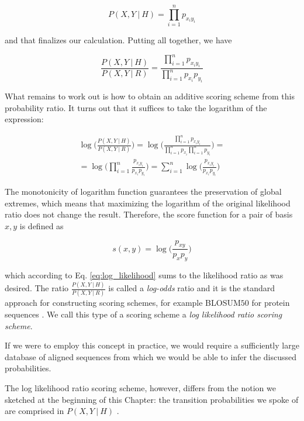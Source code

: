 \begin{equation}
P(X, Y ~|~ H) = \prod_{i=1}^n p_{x_i y_i}
\end{equation}

and that finalizes our calculation. Putting all together, we have

\begin{equation}
    \frac{P(X, Y ~|~ H)}{P(X, Y ~|~ R)} = \frac{\prod_{i=1}^n p_{x_i y_i}}{\prod_{i=1}^n p_{x_i}p_{y_{i}}}
\end{equation}

What remains to work out is how to obtain an additive scoring scheme from this probability ratio. It turns out that it suffices to take the logarithm of the expression:

\begin{multline}
\log\Bigg( \frac{P(X, Y ~|~ H)}{P(X, Y ~|~ R)} \Bigg) =
\log \Bigg( \frac{
\prod_{i=1}^n p_{x_i y_i} }
{\prod_{i=1}^n p_{x_i} \prod_{i=1}^n p_{y_i}} \Bigg) =\\
= \log \Bigg(\prod_{i=1}^n \frac{p_{x_i y_i}}{p_{x_i}p_{y_i}} \Bigg) =
\sum_{i=1}^n \log \Bigg( \frac{p_{x_i y_i}}{p_{x_i}p_{y_i}} \Bigg)
\label{eq:log_likelihood}
\end{multline}

The monotonicity of logarithm function guarantees the preservation of global extremes, which means that maximizing the logarithm of the original likelihood ratio does not change the result. Therefore, the score function for a pair of basis $x,y$ is defined as

\begin{equation}
s(x, y) = \log \Bigg( \frac{p_{x y}}{p_{x}p_{y}} \Bigg)
\end{equation}

which according to Eq. \ref{eq:log_likelihood} sums to the likelihood ratio as was desired. The ratio $\frac{P(X, Y ~|~ H)}{P(X, Y ~|~ R)}$ is called a \textit{log-odds} ratio and it is the standard approach for constructing scoring schemes, for example BLOSUM$50$ for protein sequences \cite{Durbin1998}. We call this type of a scoring scheme a \textit{log likelihood ratio scoring scheme}.

If we were to employ this concept in practice, we would require a sufficiently large database of aligned sequences from which we would be able to infer the discussed probabilities. 

The log likelihood ratio scoring scheme, however, differs from the notion we sketched at the beginning of this Chapter: the transition probabilities we spoke of are comprised in $P(X, Y ~|~ H)$ \cite{Durbin1998}.

